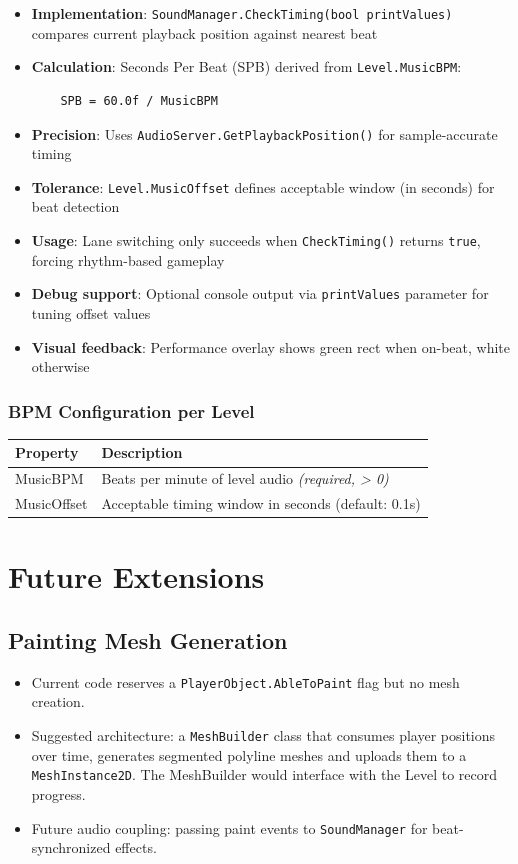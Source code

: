 \documentclass{report}
\begin{document}
\begin{itemize}[noitemsep]
	\item \textbf{Implementation}: \texttt{SoundManager.CheckTiming(bool printValues)} compares current playback position against nearest beat
	\item \textbf{Calculation}: Seconds Per Beat (SPB) derived from \texttt{Level.MusicBPM}:
	\begin{verbatim}
	SPB = 60.0f / MusicBPM
	\end{verbatim}
	\item \textbf{Precision}: Uses \texttt{AudioServer.GetPlaybackPosition()} for sample-accurate timing
	\item \textbf{Tolerance}: \texttt{Level.MusicOffset} defines acceptable window (in seconds) for beat detection
	\item \textbf{Usage}: Lane switching only succeeds when \texttt{CheckTiming()} returns \texttt{true}, forcing rhythm-based gameplay
	\item \textbf{Debug support}: Optional console output via \texttt{printValues} parameter for tuning offset values
	\item \textbf{Visual feedback}: Performance overlay shows green rect when on-beat, white otherwise
\end{itemize}

\subsection{BPM Configuration per Level}
\begin{longtable}{|l|l|}
	\hline
	\textbf{Property} & \textbf{Description} \\
	\hline
	MusicBPM & Beats per minute of level audio \textit{(required, > 0)} \\
	\hline
	MusicOffset & Acceptable timing window in seconds (default: 0.1s) \\
	\hline
\end{longtable}

\chapter{Future Extensions}
\section{Painting Mesh Generation}
\begin{itemize}[noitemsep]
	\item Current code reserves a \texttt{PlayerObject.AbleToPaint} flag but no mesh creation.
	\item Suggested architecture: a \texttt{MeshBuilder} class that consumes player positions over time, generates segmented polyline meshes and uploads them to a \texttt{MeshInstance2D}. The MeshBuilder would interface with the Level to record progress.
	\item Future audio coupling: passing paint events to \texttt{SoundManager} for beat-synchronized effects.
\end{itemize}
\end{document}
